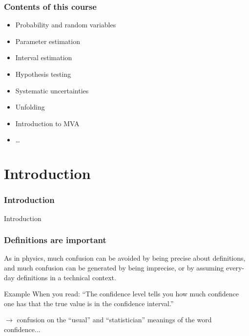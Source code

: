 \documentclass[9pt]{beamer}
\begin{document}
\begin{frame}
 \frametitle{Contents of this course}
 
 \begin{itemize}
  \item Probability and random variables
  \item Parameter estimation
  \item Interval estimation
  \item Hypothesis testing
  \item Systematic uncertainties
  \item Unfolding
  \item Introduction to MVA
  \item \dots
 \end{itemize}

\end{frame}

%  

\section{Introduction}

\begin{frame}
 \frametitle{Introduction}
 
 Introduction
\end{frame}

\begin{frame}
 \frametitle{Definitions are important}

 As in physics, much confusion can be avoided by being
precise about definitions, and much confusion can be
generated by being imprecise, or by assuming every-day
definitions in a technical context.

\begin{exampleblock}{Example}
 When you read: ``The confidence level tells you how much confidence one
has that the true value is in the confidence interval.''

$\to$ confusion on the ``usual'' and ``statistician'' meanings of the word confidence...

\end{exampleblock}

\end{frame}
\end{document}
